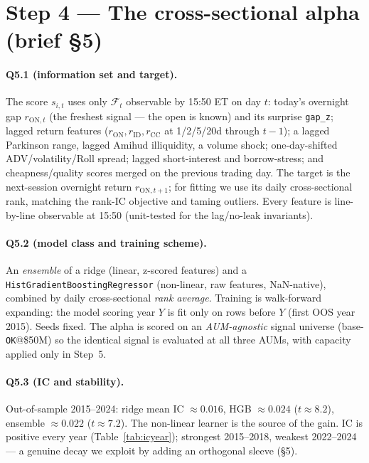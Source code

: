 \documentclass[11pt,a4paper]{article}
\newcommand{\code}[1]{\texttt{#1}}
\newcommand{\icRidge}{0.016}
\newcommand{\icHGB}{0.024}
\newcommand{\icEns}{0.022}
\newcommand{\icEnsT}{7.2}
\begin{document}
\section{Step 4 --- The cross-sectional alpha (brief §5)}

\paragraph{Q5.1 (information set and target).} The score $s_{i,t}$ uses only $\mathcal{F}_t$ observable by
15:50 ET on day $t$: today's overnight gap $r_{\mathrm{ON},t}$ (the freshest signal --- the open is known) and
its surprise \code{gap\_z}; lagged return features ($r_{\mathrm{ON}},r_{\mathrm{ID}},r_{\mathrm{CC}}$ at
1/2/5/20d through $t{-}1$); a lagged Parkinson range, lagged Amihud illiquidity, a volume shock; one-day-shifted
ADV/volatility/Roll spread; lagged short-interest and borrow-stress; and cheapness/quality scores merged on the
previous trading day. The target is the next-session overnight return $r_{\mathrm{ON},t+1}$; for fitting we use
its daily cross-sectional rank, matching the rank-IC objective and taming outliers. Every feature is
line-by-line observable at 15:50 (unit-tested for the lag/no-leak invariants).

\paragraph{Q5.2 (model class and training scheme).} An \emph{ensemble} of a ridge (linear, z-scored features)
and a \code{HistGradientBoostingRegressor} (non-linear, raw features, NaN-native), combined by daily
cross-sectional \emph{rank average}. Training is walk-forward expanding: the model scoring year $Y$ is fit only
on rows before $Y$ (first OOS year 2015). Seeds fixed. The alpha is scored on an \emph{AUM-agnostic} signal
universe (base-\code{OK}@\$50M) so the identical signal is evaluated at all three AUMs, with capacity applied
only in Step~5.

\paragraph{Q5.3 (IC and stability).} Out-of-sample 2015--2024: ridge mean IC $\approx\icRidge$, HGB
$\approx\icHGB$ ($t\approx8.2$), ensemble $\approx\icEns$ ($t\approx\icEnsT$). The non-linear learner is the
source of the gain. IC is positive every year (Table~\ref{tab:icyear}); strongest 2015--2018, weakest
2022--2024 --- a genuine decay we exploit by adding an orthogonal sleeve (\S5).
\end{document}
